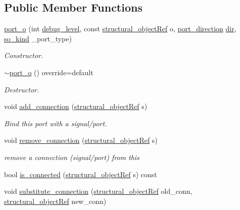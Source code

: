 \subsection*{Public Member Functions}
\begin{DoxyCompactItemize}
\item 
\hyperlink{structport__o_abdee309e228cb9b4e085ce1a3d5ae41d}{port\+\_\+o} (int \hyperlink{classstructural__object_ac2744292aa7f0fca3742133d16bb3201}{debug\+\_\+level}, const \hyperlink{structural__objects_8hpp_a8ea5f8cc50ab8f4c31e2751074ff60b2}{structural\+\_\+object\+Ref} o, \hyperlink{structport__o_adb254df5665ff28b0769491cc3899fd5}{port\+\_\+direction} \hyperlink{structport__o_a27f4a8d47d3f3b064d72443da1ee450c}{dir}, \hyperlink{structural__objects_8hpp_acf52399aecacb7952e414c5746ce6439}{so\+\_\+kind} \+\_\+port\+\_\+type)
\begin{DoxyCompactList}\small\item\em Constructor. \end{DoxyCompactList}\item 
\hyperlink{structport__o_a1031982b67bfb70af907cb1f793d7e54}{$\sim$port\+\_\+o} () override=default
\begin{DoxyCompactList}\small\item\em Destructor. \end{DoxyCompactList}\item 
void \hyperlink{structport__o_a9f9966ea1f2df677fd3985149eb2393e}{add\+\_\+connection} (\hyperlink{structural__objects_8hpp_a8ea5f8cc50ab8f4c31e2751074ff60b2}{structural\+\_\+object\+Ref} s)
\begin{DoxyCompactList}\small\item\em Bind this port with a signal/port. \end{DoxyCompactList}\item 
void \hyperlink{structport__o_a3f83bbe84dd1283961d15cda2850bcad}{remove\+\_\+connection} (\hyperlink{structural__objects_8hpp_a8ea5f8cc50ab8f4c31e2751074ff60b2}{structural\+\_\+object\+Ref} s)
\begin{DoxyCompactList}\small\item\em remove a connection (signal/port) from this \end{DoxyCompactList}\item 
bool \hyperlink{structport__o_a2f651a3d9d3b07bf949fe01105b59784}{is\+\_\+connected} (\hyperlink{structural__objects_8hpp_a8ea5f8cc50ab8f4c31e2751074ff60b2}{structural\+\_\+object\+Ref} s) const
\item 
void \hyperlink{structport__o_a3e10db29a011de4d51efb9b3a522479c}{substitute\+\_\+connection} (\hyperlink{structural__objects_8hpp_a8ea5f8cc50ab8f4c31e2751074ff60b2}{structural\+\_\+object\+Ref} old\+\_\+conn, \hyperlink{structural__objects_8hpp_a8ea5f8cc50ab8f4c31e2751074ff60b2}{structural\+\_\+object\+Ref} new\+\_\+conn)

\end{DoxyCompactItemize}
